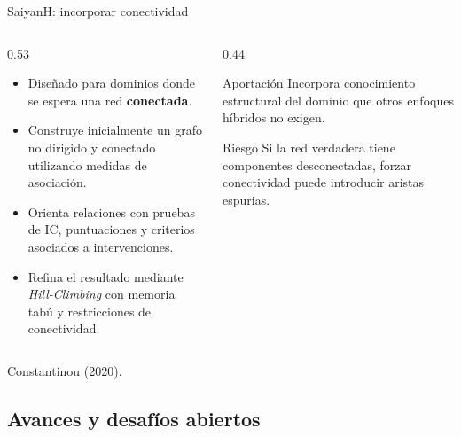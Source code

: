 \documentclass[aspectratio=169,11pt]{beamer}
\begin{document}
\begin{frame}[t]{SaiyanH: incorporar conectividad}
  \begin{columns}[T,onlytextwidth]
    \begin{column}{0.53\textwidth}
      \begin{itemize}
        \item Diseñado para dominios donde se espera una red
        \textbf{conectada}.

        \item Construye inicialmente un grafo no dirigido y
        conectado utilizando medidas de asociación.

        \item Orienta relaciones con pruebas de IC,
        puntuaciones y criterios asociados a intervenciones.

        \item Refina el resultado mediante \textit{Hill-Climbing}
        con memoria tabú y restricciones de conectividad.
      \end{itemize}
    \end{column}

    \begin{column}{0.44\textwidth}
      \begin{block}{Aportación}
        Incorpora conocimiento estructural del dominio
        que otros enfoques híbridos no exigen.
      \end{block}

      \begin{alertblock}{Riesgo}
        Si la red verdadera tiene componentes desconectadas,
        forzar conectividad puede introducir aristas espurias.
      \end{alertblock}
    \end{column}
  \end{columns}

  \vfill

  {\scriptsize\color{upmgray}Constantinou (2020).}
  \vspace{0.00cm}

\end{frame}

\subsection{Avances y desafíos abiertos}
\end{document}
